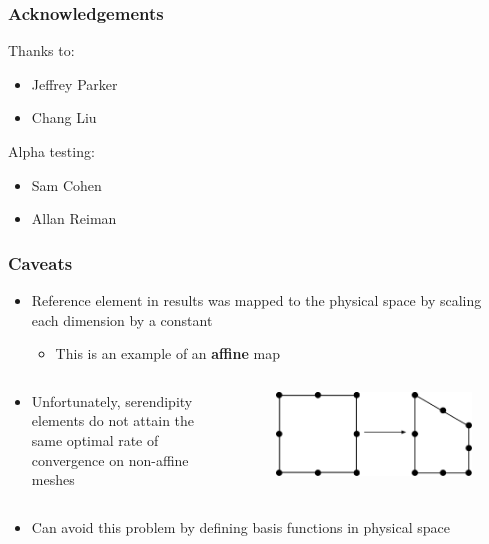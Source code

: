 \documentclass[serif,12pt]{beamer}
\begin{document}
\begin{frame}
\frametitle{Acknowledgements}
	Thanks to:
	\begin{itemize}
		\item Jeffrey Parker
		\item Chang Liu
	\end{itemize}
	
	Alpha testing:
	\begin{itemize}
		\item Sam Cohen
		\item Allan Reiman
	\end{itemize}
\end{frame}

\begin{frame}
\frametitle{Caveats}
	\begin{itemize}
		\item Reference element in results was mapped to the physical space by scaling each dimension by a constant
		\begin{itemize}
			\item This is an example of an \textbf{affine} map
		\end{itemize}
	\end{itemize}
	\begin{columns}
		\begin{column}{0.7\linewidth}
			\begin{itemize}
				\item Unfortunately, serendipity elements do not attain the same optimal rate of convergence on non-affine meshes%
			\end{itemize}
		\end{column}
	
		\begin{column}{0.3\linewidth}
			\begin{figure}
				\includegraphics[width=.9\textwidth]{figures/nonaffine.pdf}
			\end{figure}
		\end{column}
	\end{columns}
\begin{itemize}
	
	\item Can avoid this problem by defining basis functions in physical space
\end{itemize}
\end{frame}
\end{document}
